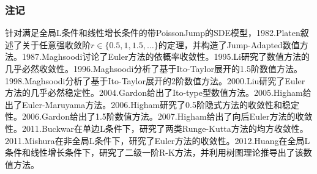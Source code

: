         \subsubsection{注记}
            \par
            针对满足全局L条件和线性增长条件的带PoissonJump的SDE模型，1982.Platen\cite{1982.Platen}叙述了关于任意强收敛阶$r\in \{0.5,1,1.5,\dots\}$的定理，并构造了Jump-Adapted数值方法。1987.Maghsoodi\cite{1987.Maghsoodi}讨论了Euler方法的依概率收敛性。1995.Li\cite{1995.Li}研究了数值方法的几乎必然收敛性。1996.Maghsoodi\cite{1996.Maghsoodi}分析了基于Ito-Taylor展开的1.5阶数值方法。1998.Maghsoodi\cite{1998.Maghsoodi}分析了基于Ito-Taylor展开的2阶数值方法。2000.Liu\cite{2000.Liu}研究了Euler方法的几乎必然稳定性。2004.Gardon\cite{2004.Gardon}给出了Ito-type型数值方法。2005.Higham\cite{2005.Higham}给出了Euler-Maruyama方法。2006.Higham\cite{2006.Higham}研究了0.5阶隐式方法的收敛性和稳定性。2006.Gardon\cite{2006.Gardon}给出了1.5阶数值方法。2007.Higham\cite{2007.Higham}给出了向后Euler方法的收敛性。2011.Buckwar\cite{2011.Buckwar}在单边L条件下，研究了两类Runge-Kutta方法的均方收敛性。2011.Mishura\cite{2011.Mishura}在非全局L条件下，研究了Euler方法的收敛性。2012.Huang\cite{2012.Huang}在全局L条件和线性增长条件下，研究了二级一阶R-K方法，并利用树图理论推导出了该数值方法。

